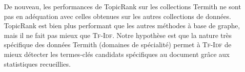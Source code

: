         De nouveau, les performances de TopicRank sur les collections Termith ne
        sont pas en adéquation avec celles obtenues sur les autres collections
        de données. TopicRank est bien plus performant que les autres méthodes à
        base de graphe, mais il ne fait pas mieux que \textsc{Tf-Idf}. Notre
        hypothèse est que la nature très spécifique des données Termith
        (domaines de spécialité) permet à \textsc{Tf-Idf} de mieux détecter les
        termes-clés candidats spécifiques au document grâce aux statistiques
        recueillies.

